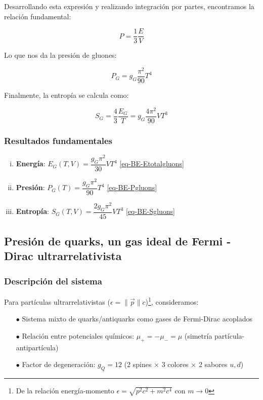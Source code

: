Desarrollando esta expresión y realizando integración por partes, encontramos la relación fundamental:

\begin{equation}\label{eq-BE-P2}
P = \frac{1}{3} \frac{E}{V}
\end{equation}

Lo que nos da la presión de gluones:

\begin{equation}\label{eq-BE-Pgluons}
P_G = g_G \frac{\pi^2}{90} T^4
\end{equation}

Finalmente, la entropía se calcula como:

\begin{equation}\label{eq-BE-Sgluons}
S_G = \frac{4}{3} \frac{E_G}{T} = g_G \frac{4\pi^2}{90} V T^3
\end{equation}

\subsubsection*{Resultados fundamentales}
\begin{enumerate}[i.]
    \item \textbf{Energía}: $E_G(T,V) = \dfrac{g_G \pi^2}{30} V T^4$ \eqref{eq-BE-Etotalgluons}
    \item \textbf{Presión}: $P_G(T) = \dfrac{g_G \pi^2}{90} T^4$ \eqref{eq-BE-Pgluons}
    \item \textbf{Entropía}: $S_G(T,V) = \dfrac{2g_G \pi^2}{45} V T^3$ \eqref{eq-BE-Sgluons}
\end{enumerate}

\subsection{Presión de quarks, un gas ideal de Fermi - Dirac ultrarrelativista}\label{sec-Pquarks}

\subsubsection{Descripción del sistema}
Para partículas ultrarrelativistas ($\epsilon = \|\vec{p}\| c$)\footnote{De la relación energía-momento $\epsilon = \sqrt{p^2c^2 + m^2c^4}$ con $m \to 0$}, consideramos:
\begin{itemize}
\item[$\bullet$] Sistema mixto de quarks/antiquarks como gases de Fermi-Dirac acoplados
\item[$\bullet$] Relación entre potenciales químicos: $\mu_+ = -\mu_- = \mu$ (simetría partícula-antipartícula)
\item[$\bullet$] Factor de degeneración: $g_Q = 12$ (2 spines $\times$ 3 colores $\times$ 2 sabores $u,d$)
\end{itemize}

